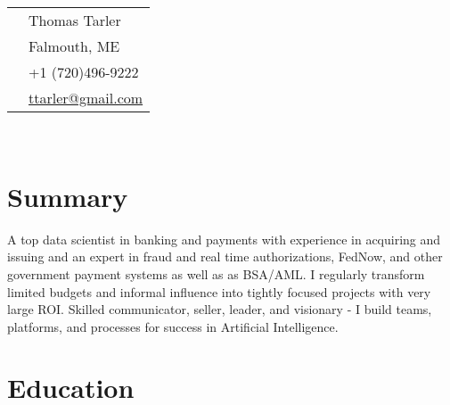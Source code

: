 \documentclass[10pt]{article} %
\begin{document}
\begin{minipage}[t]{0.44\textwidth} %
\vspace{0pt} %


\colorbox{shade}{\textcolor{text}{
\begin{tabular}{c|p{7cm}}
\raisebox{-4pt}{} & Thomas Tarler \\ %
\raisebox{-4pt}{} & Falmouth, ME\\ %
\raisebox{-3pt}{} & +1 (720)496-9222 \\ %
\raisebox{-1pt}{} & \href{mailto:ttarler@gmail.com}{ttarler@gmail.com} \\ %
\end{tabular}
}
}\\[10pt]


\section{Summary} 

A top data scientist in banking and payments with experience in acquiring and issuing and an expert in fraud and real time authorizations,  FedNow, and other government payment systems as well as as BSA/AML. I regularly transform limited budgets and informal influence into tightly focused projects with very large ROI. Skilled communicator, seller,  leader, and visionary - I build teams, platforms, and processes for success in Artificial Intelligence. 

	

\section{Education} 

\begin{tabular}{rl} %


\end{tabular}
\end{minipage}
\end{document}

